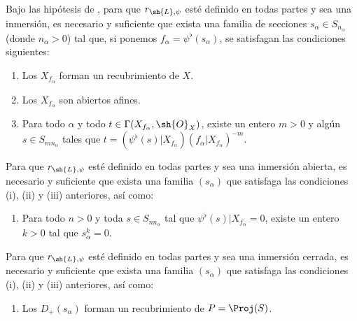 \documentclass[oneside,10pt]{amsart}
\let\EGAOriginalLabel\label
\renewcommand{\label}[1]{\phantomsection\EGAOriginalLabel{#1}}
\begin{document}
\begin{proposition}[3.8.2]
\label{II.3.8.2}
Bajo las hipótesis de , para que $r_{\sh{L},\psi}$ esté definido en todas partes y sea una inmersión, es necesario y suficiente que exista una familia de secciones $s_\alpha\in S_{n_\alpha}$ (donde $n_\alpha>0$) tal que, si ponemos $f_\alpha=\psi^\flat(s_\alpha)$, se satisfagan las condiciones siguientes:
\begin{enumerate}
  \item[\textup{(i)}] Los $X_{f_\alpha}$ forman un recubrimiento de $X$.
  \item[\textup{(ii)}] Los $X_{f_\alpha}$ son abiertos afines.
  \item[\textup{(iii)}] Para todo $\alpha$ y todo $t\in\Gamma(X_{f_\alpha},\sh{O}_X)$, existe un entero $m>0$ y algún $s\in S_{mn_\alpha}$ tales que $t=(\psi^\flat(s)|X_{f_\alpha})(f_\alpha|X_{f_\alpha})^{-m}$.
\end{enumerate}

Para que $r_{\sh{L},\psi}$ esté definido en todas partes y sea una inmersión abierta, es necesario y suficiente que exista una familia $(s_\alpha)$ que satisfaga las condiciones \textup{(i), (ii) y (iii)} anteriores, así como:
\begin{enumerate}
  \item[\textup{(iv)}] Para todo $n>0$ y toda $s\in S_{n n_\alpha}$ tal que $\psi^\flat(s)|X_{f_\alpha}=0$, existe un entero $k>0$ tal que $s_\alpha^k=0$.
\end{enumerate}

Para que $r_{\sh{L},\psi}$ esté definido en todas partes y sea una inmersión cerrada, es necesario y suficiente que exista una familia $(s_\alpha)$ que satisfaga las condiciones \textup{(i), (ii) y (iii)} anteriores, así como:
\begin{enumerate}
  \item[\textup{(v)}] Los $D_+(s_\alpha)$ forman un recubrimiento de $P=\Proj(S)$.
\end{enumerate}
\end{proposition}
\end{document}
